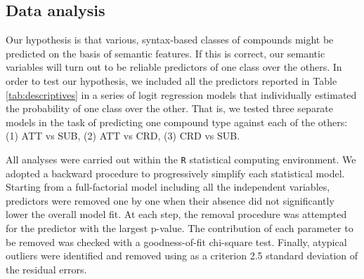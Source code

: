 \subsection{Data analysis}


Our hypothesis is that various, syntax-based classes of compounds might be predicted on the basis of semantic features. If this is correct, our semantic variables will turn out to be reliable predictors of one class over the others. In order to test our hypothesis, we included all the predictors reported in Table \ref{tab:descriptives} in a series of logit regression models that individually estimated the probability of one class over the other. That is, we tested three separate models in the task of predicting one compound type against each of the others: (1) ATT vs SUB, (2) ATT vs CRD, (3) CRD vs SUB.

All analyses were carried out within the \texttt{R} statistical computing environment. We adopted a backward procedure to progressively simplify each statistical model. Starting from a full-factorial model including all the independent variables, predictors were removed one by one when their absence did not significantly lower the overall model fit. At each step, the removal procedure was attempted for the predictor with the largest p-value. The contribution of each parameter to be removed was checked with a goodness-of-fit chi-square test. Finally, atypical outliers were identified and removed using as a criterion 2.5 standard deviation of the residual errors.



